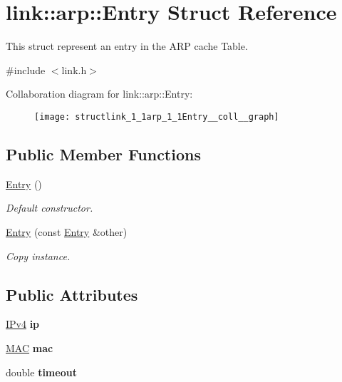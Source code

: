 \hypertarget{structlink_1_1arp_1_1Entry}{}\section{link\+:\+:arp\+:\+:Entry Struct Reference}
\label{structlink_1_1arp_1_1Entry}


This struct represent an entry in the A\+RP cache Table.  




{\ttfamily \#include $<$link.\+h$>$}



Collaboration diagram for link\+:\+:arp\+:\+:Entry\+:\nopagebreak
\begin{figure}[H]
\begin{center}
\leavevmode
\texttt{[image: structlink\_1\_1arp\_1\_1Entry\_\_coll\_\_graph]}
\end{center}
\end{figure}
\subsection*{Public Member Functions}
\begin{DoxyCompactItemize}
\item 
\hyperlink{structlink_1_1arp_1_1Entry_af14702ffc3a1b10e45a148220af6b5d4}{Entry} ()
\begin{DoxyCompactList}\small\item\em Default constructor. \end{DoxyCompactList}\item 
\hyperlink{structlink_1_1arp_1_1Entry_ab2adef8c42d08549d72c9fba0839da5c}{Entry} (const \hyperlink{structlink_1_1arp_1_1Entry}{Entry} \&other)
\begin{DoxyCompactList}\small\item\em Copy instance. \end{DoxyCompactList}\end{DoxyCompactItemize}
\subsection*{Public Attributes}
\begin{DoxyCompactItemize}
\item 
\hyperlink{structIPv4}{I\+Pv4} {\bfseries ip}\hypertarget{structlink_1_1arp_1_1Entry_a40929f76ac846faefab32e92b290c92f}{}\label{structlink_1_1arp_1_1Entry_a40929f76ac846faefab32e92b290c92f}

\item 
\hyperlink{structMAC}{M\+AC} {\bfseries mac}\hypertarget{structlink_1_1arp_1_1Entry_a72cdde0b5131b1ecc350f5ae28bb7f8a}{}\label{structlink_1_1arp_1_1Entry_a72cdde0b5131b1ecc350f5ae28bb7f8a}

\item 
double {\bfseries timeout}\hypertarget{structlink_1_1arp_1_1Entry_a8838c1d16cd38f16032703d00742df7a}{}\label{structlink_1_1arp_1_1Entry_a8838c1d16cd38f16032703d00742df7a}

\end{DoxyCompactItemize}


